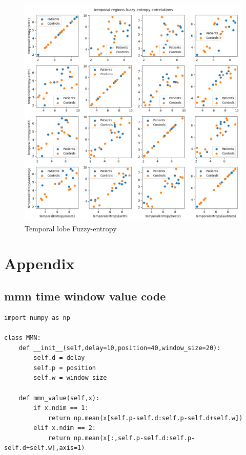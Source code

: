 \documentclass[10pt]{article}
\begin{document}
\begin{figure}[H]
  \includegraphics[width=16cm]{../../../data_analysis_results/FuzzEnt/temporal_region_corr.png}
  \caption{Temporal lobe Fuzzy-entropy}\label{temporal_fuzz}
\end{figure}

\clearpage
\section{Appendix}\label{sec:appendix}
\subsection{\gls{mmn} time window value code}\label{mmn_value_code}
\begin{lstlisting}
import numpy as np

class MMN:
    def __init__(self,delay=10,position=40,window_size=20):
        self.d = delay
        self.p = position
        self.w = window_size
    
    def mmn_value(self,x):
        if x.ndim == 1:
            return np.mean(x[self.p-self.d:self.p-self.d+self.w])
        elif x.ndim == 2:
            return np.mean(x[:,self.p-self.d:self.p-self.d+self.w],axis=1)
\end{lstlisting}
\end{document}
